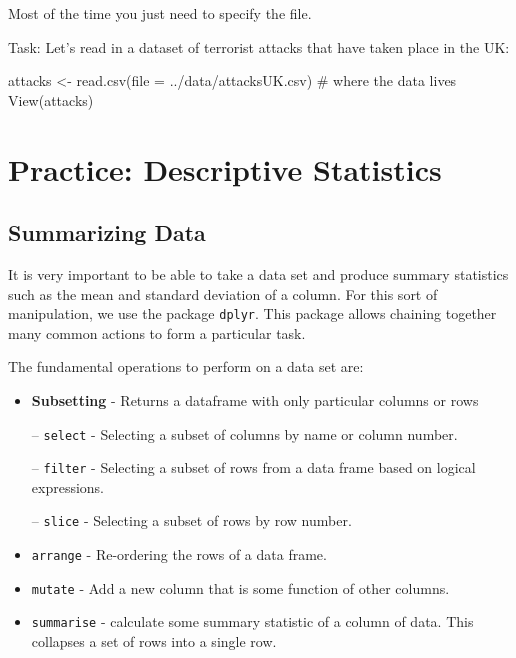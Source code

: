\documentclass[
  letterpaper,
  DIV=11,
  numbers=noendperiod]{scrreprt}
\newenvironment{Shaded}{\begin{snugshade}}{\end{snugshade}}
\newcommand{\AttributeTok}[1]{\textcolor[rgb]{0.40,0.45,0.13}{#1}}
\newcommand{\CommentTok}[1]{\textcolor[rgb]{0.37,0.37,0.37}{#1}}
\newcommand{\FunctionTok}[1]{\textcolor[rgb]{0.28,0.35,0.67}{#1}}
\newcommand{\NormalTok}[1]{\textcolor[rgb]{0.00,0.23,0.31}{#1}}
\newcommand{\OtherTok}[1]{\textcolor[rgb]{0.00,0.23,0.31}{#1}}
\newcommand{\StringTok}[1]{\textcolor[rgb]{0.13,0.47,0.30}{#1}}
\begin{document}
Most of the time you just need to specify the file. \textbar{}

Task: Let's read in a dataset of terrorist attacks that have taken place
in the UK:

\begin{Shaded}
\begin{Highlighting}[]
\NormalTok{attacks }\OtherTok{\textless{}{-}} \FunctionTok{read.csv}\NormalTok{(}\AttributeTok{file   =} \StringTok{\textquotesingle{}../data/attacksUK.csv\textquotesingle{}}\NormalTok{)  }\CommentTok{\# where the data lives                                 }
\FunctionTok{View}\NormalTok{(attacks)}
\end{Highlighting}
\end{Shaded}

\section{Practice: Descriptive
Statistics}\label{practice-descriptive-statistics}

\subsection{Summarizing Data}\label{summarizing-data}

It is very important to be able to take a data set and produce summary
statistics such as the mean and standard deviation of a column. For this
sort of manipulation, we use the package \texttt{dplyr}. This package
allows chaining together many common actions to form a particular task.

The fundamental operations to perform on a data set are:

\begin{itemize}
\item
  \textbf{Subsetting} - Returns a dataframe with only particular columns
  or rows

  -- \texttt{select} - Selecting a subset of columns by name or column
  number.

  -- \texttt{filter} - Selecting a subset of rows from a data frame
  based on logical expressions.

  -- \texttt{slice} - Selecting a subset of rows by row number.
\item
  \texttt{arrange} - Re-ordering the rows of a data frame.
\item
  \texttt{mutate} - Add a new column that is some function of other
  columns.
\item
  \texttt{summarise} - calculate some summary statistic of a column of
  data. This collapses a set of rows into a single row.
\end{itemize}
\end{document}
